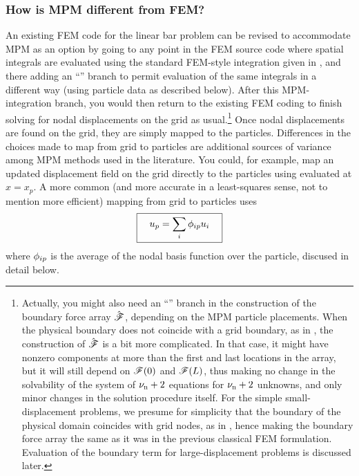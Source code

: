 \subsubsection{How is MPM different from FEM?}
An existing FEM code for the linear bar problem can be revised to accommodate MPM as an option by going to any point in the FEM source code where spatial integrals are evaluated using the standard FEM-style integration given in , and there adding an ``'' branch to permit evaluation of the same integrals in a different way (using particle data as described below). After this MPM-integration branch, you would then return to the existing FEM coding to finish solving for nodal displacements on the grid as usual.\footnote{Actually, you might also need an ``'' branch in the construction of the boundary force array $\hat{\bm{\mathscr{F}}}$, depending on the MPM particle placements. 
%
When the physical boundary does not coincide with a grid boundary, as in , the construction of $\hat{\bm{\mathscr{F}}}$ is a bit more complicated. In that case, it might have nonzero components at more than the first and last locations in the array, but it will still depend on $\mathscr{F}(0)$ and $\mathscr{F}(L)$, thus making no change in the solvability of the system of ${\nu_\text{n}}+2$ equations for ${\nu_\text{n}}+2$ unknowns, and only minor changes in the solution procedure itself.
%
For the simple \oneD small-displacement problems, we presume for simplicity that the boundary of the physical domain coincides with grid nodes, as in , hence making the boundary force array the same as it was in the previous classical FEM formulation. Evaluation of the boundary term for large-displacement problems is discussed later.}
Once nodal displacements are found on the grid, they are simply mapped to the particles. Differences in the choices made to map from grid to particles are additional sources of variance among MPM methods used in the literature. You could, for example, map an updated displacement field on the grid directly to the particles using  evaluated at $x=x_p$. A more common (and more accurate in a least-squares sense, not to mention more efficient) mapping from grid to particles uses
\begin{equation}
 \boxed{\quad u_p=\sum_i {\phi_{ip}} u_i \quad}
\end{equation}
where ${\phi_{ip}}$ is the average of the \ith nodal basis function over the \pth particle, discused in detail below. 

